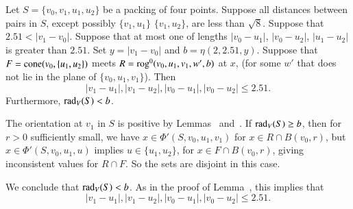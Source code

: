 \begin{tarskidata}
\begin{tarski}

\begin{lemma}
 Let $S=\{v_0,v_1,u_1,u_2\}$ be a packing of four points.
Suppose all distances between pairs in $S$, except possibly $\{v_1,u_1\}$
$\{v_1,u_2\}$, are
less than $\sqrt8$.
Suppose that $2.51 < |v_1-v_0|$.
Suppose that at most one of lengths $|v_0-u_1|$,
$|v_0-u_2|$, $|u_1-u_2|$ is greater than $2.51$.
%
Set $y=|v_1-v_0|$ and $b=\eta(2,2.51,y)$.
Suppose that $F={\operatorname{cone}}(v_0,\{u_1,u_2\})$ meets
$R={\operatorname{rog}}^0(v_0,u_1,v_1,w',b)$ at $x$, (for some $w'$ that
does not lie in the plane of $\{v_0,u_1,v_1\}$).
Then 
  $$
  |v_1-u_1|,|v_1-u_2|,|v_0-u_1|,|v_0-u_2|\le 2.51.
  $$
Furthermore, $\operatorname{rad}_V(S) < b$. 
\end{lemma}

\begin{proved}  
The orientation
at $v_1$ in $S$ is positive by Lemmas~ and~.
If $\operatorname{rad}_V(S)\ge b$, then for $r>0$ sufficiently small, we have
$x\in\Phi'(S,v_0,u_1,v_1)$ for $x\in R\cap B(v_0,r)$, 
but $x\in\Phi'(S,v_0,u_1,u)$ implies $u\in\{u_1,u_2\}$,
for $x\in F\cap B(v_0,r)$, giving inconsistent values for $R\cap F$.  So
the sets are disjoint in this case.  

We conclude that $\operatorname{rad}_V(S) < b$.
As in the proof of Lemma~,
this implies that
   $$
   |v_1-u_1|,|v_1-u_2|,|v_0-u_1|,|v_0-u_2| \le 2.51.
   $$
\swallowed\end{proved}
\end{tarski}





\begin{tarski}


\end{tarski}
\end{tarskidata}
